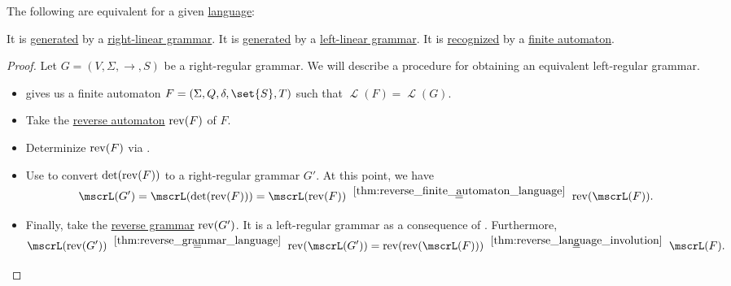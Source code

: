 \begin{proposition}\label{thm:regular_languages}
  The following are equivalent for a given \hyperref[def:formal_language/language]{language}:
  \begin{thmenum}
     It is \hyperref[def:formal_grammar/language]{generated} by a \hyperref[def:chomsky_hierarchy/regular]{right-linear grammar}.
     It is \hyperref[def:formal_grammar/language]{generated} by a \hyperref[def:chomsky_hierarchy/regular]{left-linear grammar}.
     It is \hyperref[def:finite_automaton/language]{recognized} by a \hyperref[def:finite_automaton]{finite automaton}.
  \end{thmenum}
\end{proposition}
\begin{proof}
   Let \( G = (V, \Sigma, \to, S) \) be a right-regular grammar. We will describe a procedure for obtaining an equivalent left-regular grammar.

  \begin{itemize}
    \item {} gives us a finite automaton \( F = (\Sigma, Q, \delta, \set{ S }, T) \) such that \( \mscrL(F) = \mscrL(G) \).

    \item Take the \hyperref[def:reverse_finite_automaton]{reverse automaton} \( \operatorname{rev}(F) \) of \( F \).

    \item Determinize \( \operatorname{rev}(F) \) via .

    \item Use  to convert \( \det(\operatorname{rev}(F)) \) to a right-regular grammar \( G' \). At this point, we have
    \begin{equation*}
      \mscrL(G')
      =
      \mscrL(\det(\op{rev}(F)))
      =
      \mscrL(\op{rev}(F))
      \reloset {\ref{thm:reverse_finite_automaton_language}} =
      \op{rev}(\mscrL(F)).
    \end{equation*}

    \item Finally, take the \hyperref[def:reverse_grammar]{reverse grammar} \( \operatorname{rev}(G') \). It is a left-regular grammar as a consequence of . Furthermore,
    \begin{equation*}
      \mscrL(\op{rev}(G'))
      \reloset {\ref{thm:reverse_grammar_language}} =
      \op{rev}(\mscrL(G'))
      =
      \op{rev}(\op{rev}(\mscrL(F)))
      \reloset {\ref{thm:reverse_language_involution}} =
      \mscrL(F).
    \end{equation*}


\end{itemize}
\end{proof}
